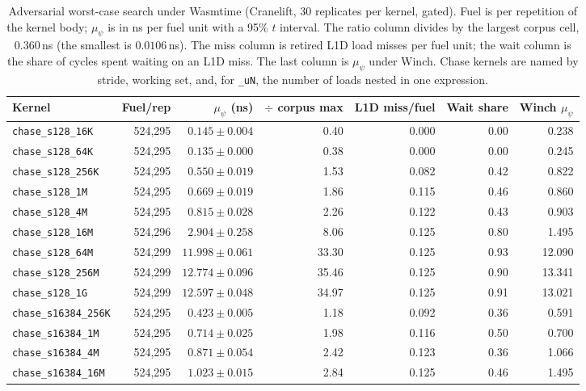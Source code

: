 \begin{table}[t]
\caption{Adversarial worst-case search under Wasmtime (Cranelift, 30 replicates per kernel, gated). Fuel is per repetition of the kernel body; $\mu_\psi$ is in ns per fuel unit with a 95\% $t$ interval. The ratio column divides by the largest corpus cell, $0.360$\,ns (the smallest is $0.0106$\,ns). The miss column is retired L1D load misses per fuel unit; the wait column is the share of cycles spent waiting on an L1D miss. The last column is $\mu_\psi$ under Winch. Chase kernels are named by stride, working set, and, for \texttt{\_uN}, the number of loads nested in one expression.}\label{tab:adversarial}
\footnotesize
\setlength{\tabcolsep}{4pt}%
\begin{adjustbox}{max width=\textwidth}%
\begin{tabular}{lrrrrrr}
\toprule
Kernel & Fuel/rep & $\mu_\psi$ (ns) & $\div$ corpus max & L1D miss/fuel & Wait share & Winch $\mu_\psi$ \\
\midrule
\texttt{chase\_s128\_16K} & 524,295 & $0.145 \pm 0.004$ & 0.40 & 0.000 & 0.00 & 0.238 \\
\texttt{chase\_s128\_64K} & 524,295 & $0.135 \pm 0.000$ & 0.38 & 0.000 & 0.00 & 0.245 \\
\texttt{chase\_s128\_256K} & 524,295 & $0.550 \pm 0.019$ & 1.53 & 0.082 & 0.42 & 0.822 \\
\texttt{chase\_s128\_1M} & 524,295 & $0.669 \pm 0.019$ & 1.86 & 0.115 & 0.46 & 0.860 \\
\texttt{chase\_s128\_4M} & 524,295 & $0.815 \pm 0.028$ & 2.26 & 0.122 & 0.43 & 0.903 \\
\texttt{chase\_s128\_16M} & 524,296 & $2.904 \pm 0.258$ & 8.06 & 0.125 & 0.80 & 1.495 \\
\texttt{chase\_s128\_64M} & 524,299 & $11.998 \pm 0.061$ & 33.30 & 0.125 & 0.93 & 12.090 \\
\texttt{chase\_s128\_256M} & 524,299 & $12.774 \pm 0.096$ & 35.46 & 0.125 & 0.90 & 13.341 \\
\texttt{chase\_s128\_1G} & 524,299 & $12.597 \pm 0.048$ & 34.97 & 0.125 & 0.91 & 13.021 \\
\texttt{chase\_s16384\_256K} & 524,295 & $0.423 \pm 0.005$ & 1.18 & 0.092 & 0.36 & 0.591 \\
\texttt{chase\_s16384\_1M} & 524,295 & $0.714 \pm 0.025$ & 1.98 & 0.116 & 0.50 & 0.700 \\
\texttt{chase\_s16384\_4M} & 524,295 & $0.871 \pm 0.054$ & 2.42 & 0.123 & 0.36 & 1.066 \\
\texttt{chase\_s16384\_16M} & 524,295 & $1.023 \pm 0.015$ & 2.84 & 0.125 & 0.46 & 1.495 \\

\end{tabular}
\end{adjustbox}
\end{table}
